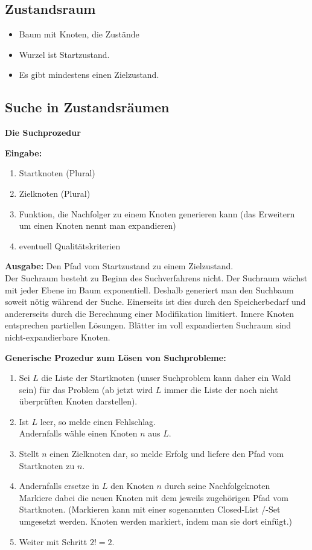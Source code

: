 \documentclass[runningheads,deutsch]{llncs}
\begin{document}
\subsection{Zustandsraum}
\begin{itemize}
    \item Baum mit Knoten, die Zustände
    \item Wurzel ist Startzustand. 
    \item Es gibt mindestens einen Zielzustand.
\end{itemize}

\subsection{Suche in Zustandsräumen}
\textbf{Die Suchprozedur}

\textbf{Eingabe:}
\begin{enumerate}
    \item Startknoten (Plural)
    \item Zielknoten (Plural)
    \item Funktion, die Nachfolger zu einem Knoten generieren kann (das Erweitern um einen Knoten nennt man expandieren)
    \item eventuell Qualitätskriterien
\end{enumerate}

\textbf{Ausgabe:} Den Pfad vom Startzustand zu einem Zielzustand. \\

Der Suchraum besteht zu Beginn des Suchverfahrens nicht. Der Suchraum wächst mit jeder Ebene im Baum exponentiell. Deshalb generiert man den Suchbaum soweit nötig während der Suche. Einerseits ist dies durch den Speicherbedarf und andererseits durch die Berechnung einer Modifikation limitiert. Innere Knoten entsprechen partiellen Lösungen. Blätter im voll expandierten Suchraum sind nicht-expandierbare Knoten.

\textbf{Generische Prozedur zum Lösen von Suchprobleme:}
\begin{enumerate}
    \item Sei $L$ die Liste der Startknoten (unser Suchproblem kann daher ein Wald sein) für das Problem (ab jetzt wird $L$ immer die Liste der noch nicht überprüften Knoten darstellen). 
    \item Ist $L$ leer, so melde einen Fehlschlag. \\
          Andernfalls wähle einen Knoten $n$ aus $L$.
    \item Stellt $n$ einen Zielknoten dar, so melde Erfolg und liefere den Pfad vom Startknoten zu $n$.
    \item Andernfalls ersetze in $L$ den Knoten $n$ durch seine Nachfolgeknoten\\
          Markiere dabei die neuen Knoten mit dem jeweils zugehörigen Pfad vom Startknoten. (Markieren kann mit einer sogenannten Closed-List /-Set umgesetzt werden. Knoten werden markiert, indem man sie dort einfügt.)
    \item Weiter mit Schritt $2! = 2$.
\end{enumerate}
\end{document}
